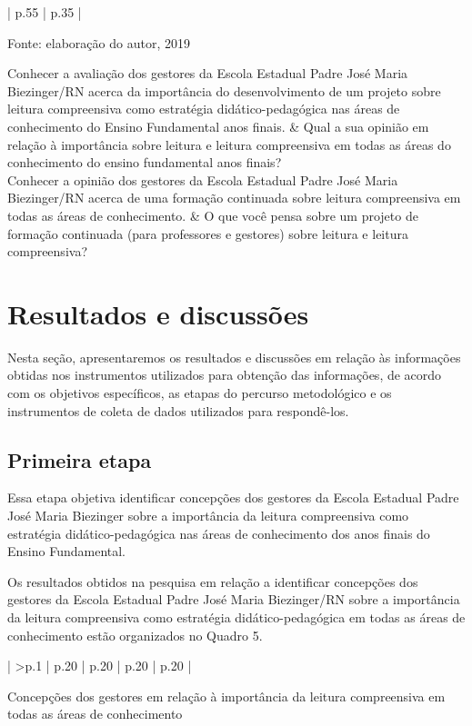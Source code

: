 \begin{refsection}
\begin{longquadro}[t]{ | p{.55\textwidth} | p{.35\textwidth} |}
        \hline
        \caption*{Fonte: elaboração do autor, 2019}
        \endlastfoot

        Conhecer a avaliação dos gestores da Escola Estadual Padre José Maria Biezinger/RN acerca da importância do desenvolvimento de um projeto sobre leitura compreensiva como estratégia didático-pedagógica nas áreas de conhecimento do Ensino Fundamental anos finais. &
        Qual a sua opinião em relação à importância sobre leitura e leitura compreensiva em todas as áreas do conhecimento do ensino fundamental anos finais? \\[18ex]
        Conhecer a opinião dos gestores da Escola Estadual Padre José Maria Biezinger/RN acerca de uma formação continuada sobre leitura compreensiva em todas as áreas de conhecimento. &
        O que você pensa sobre um projeto de formação continuada (para professores e gestores) sobre leitura e leitura compreensiva?\\
    \end{longquadro}

    \section{Resultados e discussões}

    Nesta seção, apresentaremos os resultados e discussões em relação às informações obtidas nos instrumentos utilizados para obtenção das informações, de acordo com os objetivos específicos, as etapas do percurso metodológico e os instrumentos de coleta de dados utilizados para respondê-los.

    \subsection{Primeira etapa}

    Essa etapa objetiva identificar concepções dos gestores da Escola Estadual Padre José Maria Biezinger sobre a importância da leitura compreensiva como estratégia didático-pedagógica nas áreas de conhecimento dos anos finais do Ensino Fundamental.  

    Os resultados obtidos na pesquisa em relação a identificar concepções dos gestores da Escola Estadual Padre José Maria Biezinger/RN sobre a importância da leitura compreensiva como estratégia didático-pedagógica em todas as áreas de conhecimento estão organizados no Quadro 5.

    \begin{small}
    \begin{longquadro}[t]{ | 
        >{\centering\arraybackslash}p{.1\textwidth} |
        p{.20\textwidth} |
        p{.20\textwidth} |
        p{.20\textwidth} |
        p{.20\textwidth} |
    }
        \caption{Concepções dos gestores em relação à importância da leitura compreensiva em todas as áreas de conhecimento}
        \label{quad:concepcao-gestores}\\


\end{longquadro}
\end{small}
\end{refsection}
